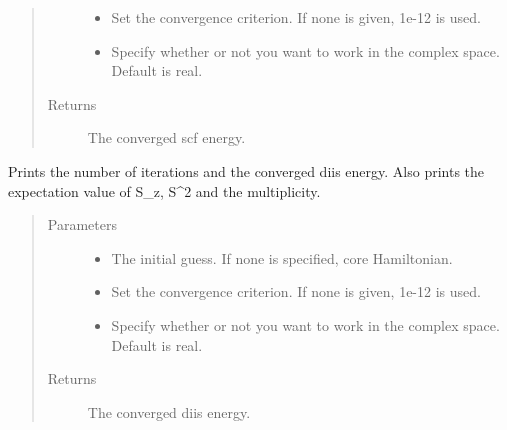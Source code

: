 \documentclass[letterpaper,10pt,english]{sphinxmanual}
\begin{document}
\begin{fulllineitems}
\begin{fulllineitems}
\begin{quote}
\begin{description}
\begin{itemize}
\item {} 
 \textendash{} Set the convergence criterion. If none is given, 1e-12 is used.

\item {} 
 \textendash{} Specify whether or not you want to work in the complex space. Default is real.

\end{itemize}

\item[{Returns}] \leavevmode
The converged scf energy.

\end{description}\end{quote}

\end{fulllineitems}


\begin{fulllineitems}
\label{\detokenize{UHF:hf.HartreeFock.UHF.MF.get_scf_solution_diis}}
Prints the number of iterations and the converged diis energy.
Also prints the expectation value of S\_z, S\textasciicircum{}2 and the multiplicity.
\begin{quote}\begin{description}
\item[{Parameters}] \leavevmode\begin{itemize}
\item {} 
 \textendash{} The initial guess. If none is specified, core Hamiltonian.

\item {} 
 \textendash{} Set the convergence criterion. If none is given, 1e-12 is used.

\item {} 
 \textendash{} Specify whether or not you want to work in the complex space. Default is real.

\end{itemize}

\item[{Returns}] \leavevmode
The converged diis energy.


\end{description}
\end{quote}
\end{fulllineitems}
\end{fulllineitems}
\end{document}
